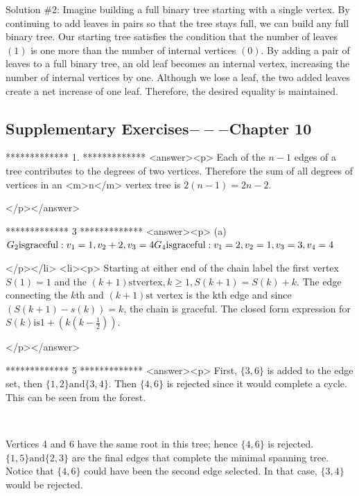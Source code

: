 Solution $\#$2: Imagine building a full binary tree starting with a single vertex. By continuing to add leaves in pairs so that the tree
stays full, we can build any full binary tree. Our starting tree satisfies the condition that the number of leaves \((1)\) is one more than the number
of internal vertices \((0)\). By adding a pair of leaves to a full binary tree, an old leaf becomes an internal vertex, increasing the number of
internal vertices by one. Although we lose a leaf, the two added leaves create a net increase of one leaf. Therefore, the desired equality is maintained.




\subsection{Supplementary Exercises$---$Chapter 10}

*************
1.
*************
<answer><p> Each of the \(n-1\) edges of a tree contributes to the degrees of two vertices. Therefore the sum of all degrees of vertices in an <m>n</m>
vertex tree is \(2(n-1)=2n-2\).

</p></answer>


*************
3
*************
<answer><p> (a) \(G_2\text{is} \text{graceful}: v_1=1, v_2+2, v_3=4\\
\\
G_4\text{is} \text{graceful}: v_1=2, v_2=1, v_3=3, v_4=4\)

</p></li>
<li><p> Starting at either end of the chain label the first vertex \(S(1)=1\) and the \((k+1)\text{st} \text{vertex}, k\geq 1, S(k+1)=S(k)+k\). The edge
connecting the \(k\text{th}\) and \((k+1)\text{st}\) vertex is the \(\text{kth}\) edge and since \((S(k+1)-s(k))=k\), the chain is graceful. The
closed form expression for \(S(k) \text{is} 1+\left(k\left(k-\frac{1}{2}\right)\right)\).

</p></answer>


*************
5
*************
<answer><p> First, \(\{3,6\}\) is added to the edge set, then \(\{1,2\} \text{and} \{3,4\}\). Then \(\{4,6\}\) is rejected since it would complete a  cycle.
This can be seen from the forest.

\begin{doublespace}
\noindent\(\)
\end{doublespace}



Vertices 4 and 6 have the same root in this tree; hence \(\{4,6\}\) is rejected. \(\{1,5\} \text{and} \{2,3\}\) are the final edges that complete
the minimal spanning tree. Notice that \(\{4,6\}\) could have been the second edge selected. In that case, \(\{3,4\}\) would be rejected.

